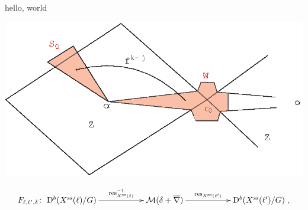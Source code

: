 \documentclass{amsart}
\begin{document}
hello, world

\includegraphics{graphics.eps}

\[
F_{\ell, \ell', \delta} \colon \xymatrix{ \mathrm{D}^b(X^{\mathrm{ss}}(\ell) / G) \ar[rr]^-{\operatorname{res}_{X^{\mathrm{ss}}(\ell)}^{-1}} & & \mathcal{M}(\delta + \overline{\nabla}) \ar[rr]^-{\operatorname{res}_{X^{\mathrm{ss}}(\ell')}} & & \mathrm{D}^b(X^{\mathrm{ss}}(\ell')/G)},
\]
\end{document}
